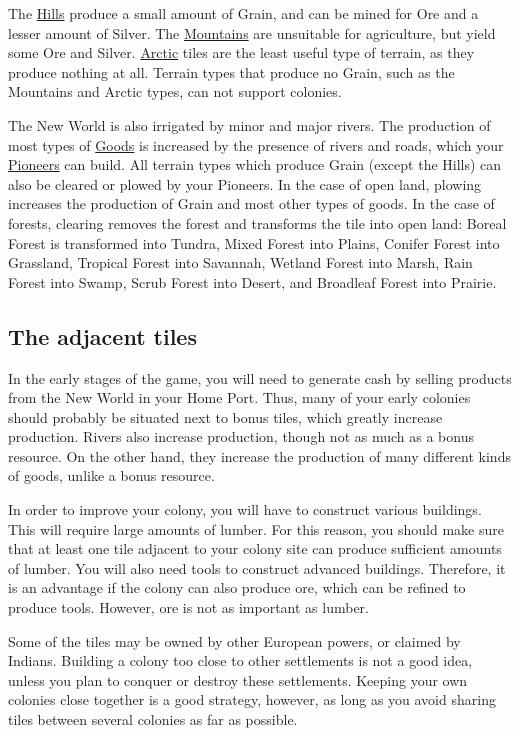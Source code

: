 \documentclass[12pt]{book}
\begin{document}
The \hyperlink{Hills}{Hills} produce a small amount of Grain, and can
be mined for Ore and a lesser amount of Silver. The
\hyperlink{Mountains}{Mountains} are unsuitable for agriculture, but
yield some Ore and Silver. \hyperlink{Arctic}{Arctic} tiles are the
least useful type of terrain, as they produce nothing at all. Terrain
types that produce no Grain, such as the Mountains and Arctic types,
can not support colonies.

The New World is also irrigated by minor and major rivers. The
production of most types of \hyperlink{Goods}{Goods} is increased by
the presence of rivers and roads, which your
\hyperlink{Pioneer}{Pioneers} can build. All terrain types which
produce Grain (except the Hills) can also be cleared or plowed by your
Pioneers. In the case of open land, plowing increases the production
of Grain and most other types of goods. In the case of forests,
clearing removes the forest and transforms the tile into open land:
Boreal Forest is transformed into Tundra, Mixed Forest into Plains,
Conifer Forest into Grassland, Tropical Forest into Savannah, Wetland
Forest into Marsh, Rain Forest into Swamp, Scrub Forest into Desert,
and Broadleaf Forest into Prairie.


\hypertarget{The adjacent tiles}{\subsection{The adjacent tiles}}

In the early stages of the game, you will need to generate cash by
selling products from the New World in your Home Port. Thus, many of
your early colonies should probably be situated next to bonus tiles,
which greatly increase production. Rivers also increase production,
though not as much as a bonus resource. On the other hand, they
increase the production of many different kinds of goods, unlike a
bonus resource.

In order to improve your colony, you will have to construct various
buildings. This will require large amounts of lumber. For this reason,
you should make sure that at least one tile adjacent to your colony
site can produce sufficient amounts of lumber. You will also need
tools to construct advanced buildings. Therefore, it is an advantage
if the colony can also produce ore, which can be refined to produce
tools. However, ore is not as important as lumber.

Some of the tiles may be owned by other European powers, or claimed by
Indians. Building a colony too close to other settlements is not a
good idea, unless you plan to conquer or destroy these settlements.
Keeping your own colonies close together is a good strategy, however,
as long as you avoid sharing tiles between several colonies as far as
possible.
\end{document}
